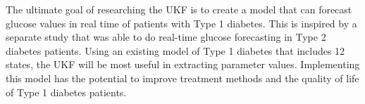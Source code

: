 \noindent  The ultimate goal of researching the UKF is to create a model that can forecast glucose values in real time of patients with Type 1 diabetes. This is inspired by a separate study that was able to do real-time glucose forecasting in Type 2 diabetes patients. Using an existing model of Type 1 diabetes that includes 12 states, the UKF will be most useful in extracting parameter values. Implementing this model has the potential to improve treatment methods and the quality of life of Type 1 diabetes patients.




